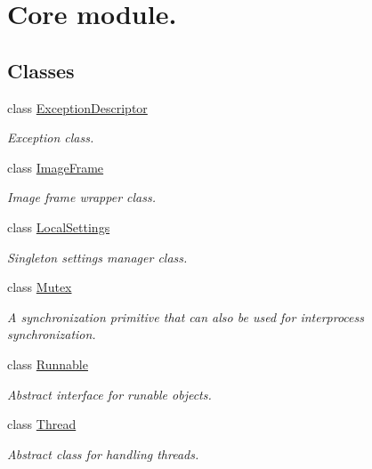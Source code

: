 \hypertarget{group___core}{\section{Core module.}
\label{group___core}
}
\subsection*{Classes}
\begin{DoxyCompactItemize}
\item 
class \hyperlink{class_exception_descriptor}{Exception\-Descriptor}
\begin{DoxyCompactList}\small\item\em Exception class. \end{DoxyCompactList}\item 
class \hyperlink{class_image_frame}{Image\-Frame}
\begin{DoxyCompactList}\small\item\em Image frame wrapper class. \end{DoxyCompactList}\item 
class \hyperlink{class_local_settings}{Local\-Settings}
\begin{DoxyCompactList}\small\item\em Singleton settings manager class. \end{DoxyCompactList}\item 
class \hyperlink{class_mutex}{Mutex}
\begin{DoxyCompactList}\small\item\em A synchronization primitive that can also be used for interprocess synchronization. \end{DoxyCompactList}\item 
class \hyperlink{class_runnable}{Runnable}
\begin{DoxyCompactList}\small\item\em Abstract interface for runable objects. \end{DoxyCompactList}\item 
class \hyperlink{class_thread}{Thread}
\begin{DoxyCompactList}\small\item\em Abstract class for handling threads. \end{DoxyCompactList}\end{DoxyCompactItemize}
